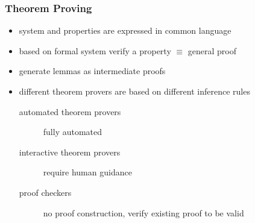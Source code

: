 \documentclass[a4paper, 10pt]{article}
\begin{document}
\subsubsection*{Theorem Proving}
\begin{itemize}
    \item system and properties are expressed in common language
    \item based on formal system \follows verify a property $\equiv$ general proof
    \item generate lemmas as intermediate proofs
    \item different theorem provers are based on different inference rules
    \begin{description}
        \item[automated theorem provers] fully automated
        \item[interactive theorem provers] require human guidance
        \item[proof checkers] no proof construction, verify existing proof to be valid
    \end{description}
\end{itemize}
\end{document}
